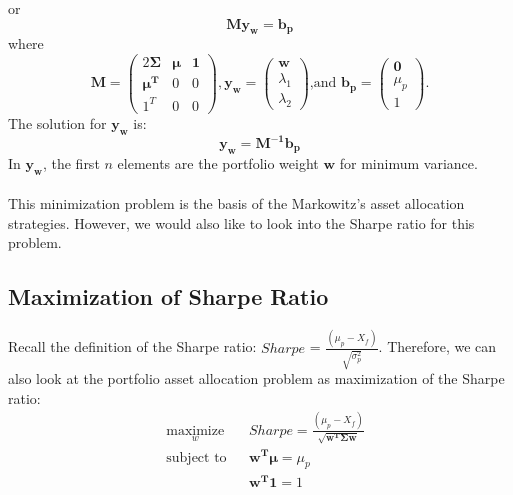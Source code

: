 \documentclass[12pt,titlepage,a4paper]{article}
\begin{document}
			or 
			$$
				\mathbf{My_w} = \mathbf{b_p}
			$$
			where
			\begin{equation*}
				\mathbf{M} = \begin{pmatrix} 
					2\mathbf{\Sigma} & \pmb{\mu} & \mathbf{1} \\ 
					\mathbf{\mu^T} & 0 & 0 \\ 
					1^T & 0 & 0 
				\end{pmatrix}, 
				\mathbf{y_w}=\begin{pmatrix}
					\mathbf{w} \\ \lambda_1 \\ \lambda_2
				\end{pmatrix} 
				\text{,and }
				\mathbf{b_p} = \begin{pmatrix}
					\mathbf{0} \\ \mu_p \\ 1
				\end{pmatrix}.
			\end{equation*}
			The solution for $\mathbf{y_w}$ is: 
			\begin{equation}
				\mathbf{y_w} = \mathbf{M^{-1}b_p}
			\end{equation}
			In $\mathbf{y_w}$, the first $n$ elements are the portfolio weight $\mathbf{w}$ for minimum variance. \\ \\

			This minimization problem is the basis of the Markowitz's asset allocation strategies. However, we would also like to look into the Sharpe ratio for this problem. \\

	\subsection{Maximization of Sharpe Ratio}
		Recall the definition of the Sharpe ratio: $Sharpe$ = $\frac{(\mu_p - X_f)}{\sqrt{\sigma_p^2}}$. Therefore, we can also look at the portfolio asset allocation problem as maximization of the Sharpe ratio: 
		\begin{equation}
			\begin{aligned}
				& \underset{w}{\text{maximize}}
				& & Sharpe = \frac{(\mu_p - X_f)}{\sqrt{\mathbf{w^T\Sigma w}}} \\
				& \text{subject to}
				& & \mathbf{w^T}\pmb{\mu} = \mu_p \\
				&&& \mathbf{w^T1}=1
			\end{aligned}
		\end{equation}
\end{document}
